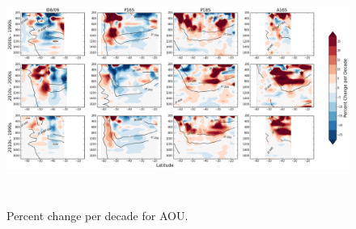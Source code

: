 \documentclass[11pt]{article}
\begin{document}
\begin{figure}[h!]
    \centering
    \includegraphics[height=3in]{AOU_change.png}
    \caption{Percent change per decade for AOU. }
\end{figure}
\end{document}
